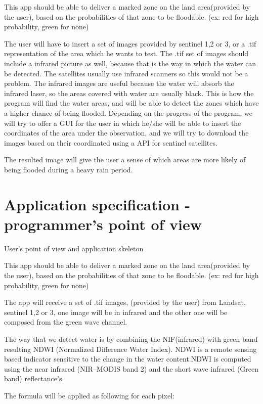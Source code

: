 \documentclass[12pt, a4paper]{report}
\begin{document}
This app should be able to deliver a marked zone on the land area(provided by the user), based on the probabilities of that zone to be floodable. (ex: red for high probability, green for none)\par 

The user will have to insert a set of images provided by sentinel 1,2 or 3, or a .tif representation of the area which he wants to test. The .tif set of images should include a infrared picture as well, because that is the way in which the water can be detected. The satellites usually use infrared scanners so this would not be a problem. The infrared images are useful because the water will absorb the infrared laser, so the areas covered with water are usually black. This is how the program will find the water areas, and will be able to detect the zones which have a higher chance of being flooded. Depending on the progress of the program, we will try to offer a GUI for the user in which he/she will be able to insert the coordinates of the area under the observation, and we will try to download the images based on their coordinated using a API for sentinel satellites.

\par 
The resulted image will give the user a sense of which areas are more likely of being flooded during a heavy rain period.

\newpage

\section{Application specification - programmer's point of view}

{\Large User's point of view and application skeleton\par}

This app should be able to deliver a marked zone on the land area(provided by the user), based on the probabilities of that zone to be floodable. (ex: red for high probability, green for none)\par 

The app will receive a set of .tif images, (provided by the user) from Landsat, sentinel 1,2 or 3, one image will be in infrared and the other one will be composed from the green wave channel.\par
 The way that we detect water is by combining the NIF(infrared) with green band resulting NDWI (Normalized Difference Water Index). NDWI  is a remote sensing based indicator sensitive to the change in the water content.NDWI  is computed  using  the  near  infrared  (NIR–MODIS  band  2)  and  the  short  wave infrared (Green band) reflectance’s.\par 
The formula will be applied as following for each pixel:
\end{document}
